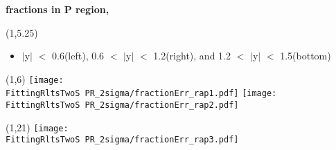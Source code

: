 \documentclass[11pt,slidescentered,red,compress,handout,hyperref={bookmarks=true},mathseriftable]{beamer}
\newcommand{\lpsi}{\ell_{\psi}}
\newcommand{\FittingRltsOneS}{../Psi1S/Fit/parameter/evaluateCtau/}
\newcommand{\FittingRltsTwoS}{../Psi2S/Fit/parameter/evaluateCtau/}
\begin{document}
\begin{frame}[t]{\small \bf fractions in P region,  }{}
\begin{textblock}{48}(1,5.25)
\begin{itemize}
\scriptsize \item $|$y$|$ $<$ 0.6(left), 0.6 $<$ $|$y$|$ $<$ 1.2(right), and 1.2 $<$ $|$y$|$ $<$ 1.5(bottom)
\end{itemize}
\end{textblock}
\begin{textblock}{48}(1,6)
\hspace*{10pt} \texttt{[image: \\FittingRltsTwoS PR\_2sigma/fractionErr\_rap1.pdf]}
\hspace*{10pt} \texttt{[image: \\FittingRltsTwoS PR\_2sigma/fractionErr\_rap2.pdf]}
\begin{textblock}{48}(1,21)
\hspace*{10pt} \texttt{[image: \\FittingRltsTwoS PR\_2sigma/fractionErr\_rap3.pdf]}
\end{textblock}
\end{textblock}
\end{frame}


\end{document}
